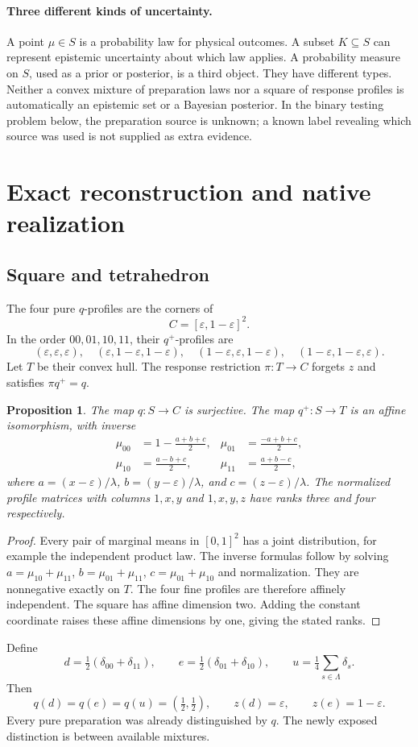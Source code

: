 \documentclass[11pt]{article}
\newtheorem{proposition}[theorem]{Proposition}
\theoremstyle{definition}
\newcommand{\eps}{\varepsilon}
\begin{document}
\paragraph{Three different kinds of uncertainty.}
A point $\mu\in S$ is a probability law for physical outcomes. A subset $K\subseteq S$ can represent epistemic uncertainty about which law applies. A probability measure on $S$, used as a prior or posterior, is a third object. They have different types. Neither a convex mixture of preparation laws nor a square of response profiles is automatically an epistemic set or a Bayesian posterior. In the binary testing problem below, the preparation source is unknown; a known label revealing which source was used is not supplied as extra evidence.

\section{Exact reconstruction and native realization}
\subsection{Square and tetrahedron}
The four pure $q$-profiles are the corners of
\[
 C=[\eps,1-\eps]^2.
\]
In the order $00,01,10,11$, their $q^+$-profiles are
\[
 (\eps,\eps,\eps),\quad (\eps,1-\eps,1-\eps),\quad
 (1-\eps,\eps,1-\eps),\quad (1-\eps,1-\eps,\eps).
\]
Let $T$ be their convex hull. The response restriction $\pi:T\to C$ forgets $z$ and satisfies $\pi q^+=q$.

\begin{proposition}\label{prop:inverse}
The map $q:S\to C$ is surjective. The map $q^+:S\to T$ is an affine isomorphism, with inverse
\begin{align*}
 \mu_{00}&=1-\frac{a+b+c}{2},&
 \mu_{01}&=\frac{-a+b+c}{2},\\
 \mu_{10}&=\frac{a-b+c}{2},&
 \mu_{11}&=\frac{a+b-c}{2},
\end{align*}
where $a=(x-\eps)/\lambda$, $b=(y-\eps)/\lambda$, and $c=(z-\eps)/\lambda$. The normalized profile matrices with columns $1,x,y$ and $1,x,y,z$ have ranks three and four respectively.
\end{proposition}
\begin{proof}
Every pair of marginal means in $[0,1]^2$ has a joint distribution, for example the independent product law. The inverse formulas follow by solving
$a=\mu_{10}+\mu_{11}$, $b=\mu_{01}+\mu_{11}$, $c=\mu_{01}+\mu_{10}$ and normalization. They are nonnegative exactly on $T$. The four fine profiles are therefore affinely independent. The square has affine dimension two. Adding the constant coordinate raises these affine dimensions by one, giving the stated ranks.
\end{proof}
Define
\[
 d=\tfrac12(\delta_{00}+\delta_{11}),\qquad
 e=\tfrac12(\delta_{01}+\delta_{10}),\qquad
 u=\tfrac14\sum_{s\in\Lambda}\delta_s.
\]
Then
\begin{equation}\label{eq:de}
 q(d)=q(e)=q(u)=(\tfrac12,\tfrac12),\qquad z(d)=\eps,
 \qquad z(e)=1-\eps.
\end{equation}
Every pure preparation was already distinguished by $q$. The newly exposed distinction is between available mixtures.
\end{document}
